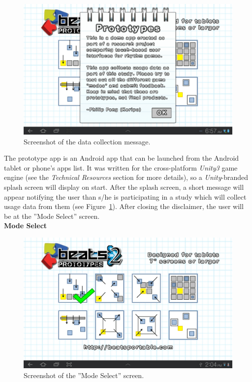 \documentclass{sig-alternate}
\begin{document}
\begin{figure}[htb!]
	\begin{center}
		\includegraphics[width=1\linewidth]{figure_screenshot_disclaimer}
	\end{center}
	\vspace{-12pt}
	\caption{Screenshot of the data collection message.}
	\label{fig:screenshot_disclaimer}
\end{figure}

The prototype app is an Android app that can be launched from the Android tablet or phone's apps list. It was written for the cross-platform \textit{Unity3} game engine (see the \textit{Technical Resources} section for more details), so a \textit{Unity}-branded splash screen will display on start. After the splash screen, a short message will appear notifying the user than s/he is participating in a study which will collect usage data from them (see Figure~\ref{fig:screenshot_disclaimer}). After closing the disclaimer, the user will be at the ''Mode Select'' screen. \\

\noindent \textbf{Mode Select}

\begin{figure}[htb!]
	\begin{center}
		\includegraphics[width=1\linewidth]{figure_screenshot_main}
	\end{center}
	\vspace{-12pt}
	\caption{Screenshot of the ''Mode Select'' screen.}
	\label{fig:screenshot_main}
\end{figure}
\end{document}
